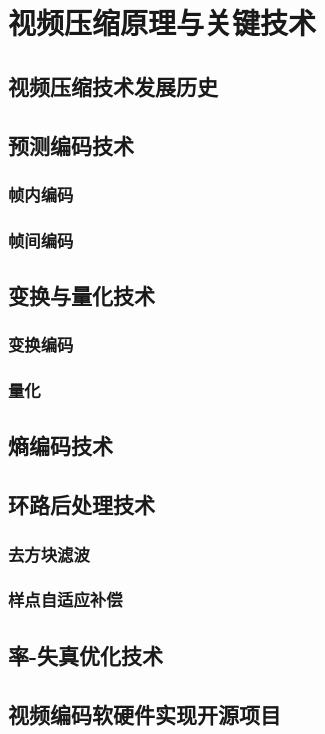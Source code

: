 \chapter{视频压缩原理与关键技术}
\label{cha:c2}

\section{视频压缩技术发展历史}

\section{预测编码技术}
\subsection{帧内编码}
\subsection{帧间编码}

\section{变换与量化技术}
\subsection{变换编码}
\subsection{量化}

\section{熵编码技术}

\section{环路后处理技术}
\subsection{去方块滤波}
\subsection{样点自适应补偿}

\section{率-失真优化技术}

\section{视频编码软硬件实现开源项目}